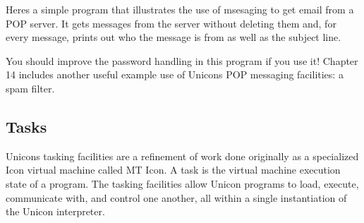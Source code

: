 Here{\textquotesingle}s a simple program that illustrates the use of
msesaging to get email from a POP server. It gets messages from the
server without deleting them and, for every message, prints out who the
message is from as well as the subject line.


You should improve the password handling in this program if you use it!
Chapter 14 includes another useful example use of
Unicon{\textquotesingle}s POP messaging facilities: a spam filter.

\subsection{Tasks}

Unicon{\textquotesingle}s tasking facilities are a refinement of work
done originally as a specialized Icon virtual machine called MT Icon. A
task is the virtual machine execution state of a program. The tasking
facilities allow Unicon programs to load, execute, communicate with,
and control one another, all within a single instantiation of the
Unicon interpreter. 

